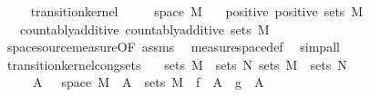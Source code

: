 \begin{isabellebody}
\ \ \isamarkupfalse%
%
\endisatagproof
{\isafoldproof}%
%
\isadelimproof
\isanewline
%
\endisadelimproof
\isanewline
{}\isamarkupfalse%
\ {\isacharparenleft}{\kern0pt}\ transition{\isacharunderscore}{\kern0pt}kernel{\isacharparenright}{\kern0pt}\isanewline
\ \ \ {\isachardoublequoteopen}{\isasymomega}\ {\isasymin}\ space\ M{\isachardoublequoteclose}\isanewline
\ \ \ positive{\isacharcolon}{\kern0pt}\ {\isachardoublequoteopen}positive\ {\isacharparenleft}{\kern0pt}sets\ M{\isacharprime}{\kern0pt}{\isacharparenright}{\kern0pt}\ {\isacharparenleft}{\kern0pt}{\isasymkappa}\ {\isasymomega}{\isacharparenright}{\kern0pt}{\isachardoublequoteclose}\isanewline
\ \ \ countably{\isacharunderscore}{\kern0pt}additive{\isacharcolon}{\kern0pt}\ {\isachardoublequoteopen}countably{\isacharunderscore}{\kern0pt}additive\ {\isacharparenleft}{\kern0pt}sets\ M{\isacharprime}{\kern0pt}{\isacharparenright}{\kern0pt}\ {\isacharparenleft}{\kern0pt}{\isasymkappa}\ {\isasymomega}{\isacharparenright}{\kern0pt}{\isachardoublequoteclose}\isanewline
%
\isadelimproof
\ \ %
\endisadelimproof
%
\isatagproof
{}\isamarkupfalse%
\ space{\isacharunderscore}{\kern0pt}source{\isacharunderscore}{\kern0pt}measure{\isacharbrackleft}{\kern0pt}OF\ assms{\isacharbrackright}{\kern0pt}\ \isamarkupfalse%
\ measure{\isacharunderscore}{\kern0pt}space{\isacharunderscore}{\kern0pt}def\ \isamarkupfalse%
\ {\isacharparenleft}{\kern0pt}simp{\isacharunderscore}{\kern0pt}all{\isacharparenright}{\kern0pt}%
\endisatagproof
{\isafoldproof}%
%
\isadelimproof
\isanewline
%
\endisadelimproof
\isanewline
{}\isamarkupfalse%
\ transition{\isacharunderscore}{\kern0pt}kernel{\isacharunderscore}{\kern0pt}cong{\isacharunderscore}{\kern0pt}sets{\isacharcolon}{\kern0pt}\isanewline
\ \ \ {\isachardoublequoteopen}sets\ M\ {\isacharequal}{\kern0pt}\ sets\ N{\isachardoublequoteclose}\ {\isachardoublequoteopen}sets\ M{\isacharprime}{\kern0pt}\ {\isacharequal}{\kern0pt}\ sets\ N{\isacharprime}{\kern0pt}{\isachardoublequoteclose}\isanewline
\ \ \ \ {\isachardoublequoteopen}{\isasymAnd}{\isasymomega}\ A{\isacharprime}{\kern0pt}{\isachardot}{\kern0pt}\ {\isasymomega}\ {\isasymin}\ space\ M\ {\isasymLongrightarrow}\ A{\isacharprime}{\kern0pt}\ {\isasymin}\ sets\ M{\isacharprime}{\kern0pt}\ {\isasymLongrightarrow}\ f\ {\isasymomega}\ A{\isacharprime}{\kern0pt}\ {\isacharequal}{\kern0pt}\ g\ {\isasymomega}\ A{\isacharprime}{\kern0pt}{\isachardoublequoteclose}\isanewline

\end{isabellebody}
